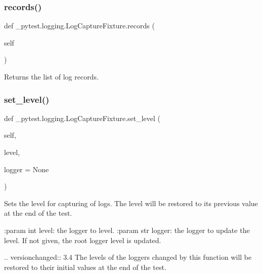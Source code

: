 \subsubsection{\texorpdfstring{records()}{records()}}
{\footnotesize\ttfamily def \+\_\+pytest.\+logging.\+Log\+Capture\+Fixture.\+records (\begin{DoxyParamCaption}\item[{}]{self }\end{DoxyParamCaption})}

\begin{DoxyVerb}Returns the list of log records.\end{DoxyVerb}
 \mbox{\label{class__pytest_1_1logging_1_1_log_capture_fixture_aca085734a490329f84018fa43c426e7d}} 
\subsubsection{\texorpdfstring{set\+\_\+level()}{set\_level()}}
{\footnotesize\ttfamily def \+\_\+pytest.\+logging.\+Log\+Capture\+Fixture.\+set\+\_\+level (\begin{DoxyParamCaption}\item[{}]{self,  }\item[{}]{level,  }\item[{}]{logger = {\ttfamily None} }\end{DoxyParamCaption})}

\begin{DoxyVerb}Sets the level for capturing of logs. The level will be restored to its previous value at the end of
the test.

:param int level: the logger to level.
:param str logger: the logger to update the level. If not given, the root logger level is updated.

.. versionchanged:: 3.4
    The levels of the loggers changed by this function will be restored to their initial values at the
    end of the test.
\end{DoxyVerb}
 \mbox{\label{class__pytest_1_1logging_1_1_log_capture_fixture_a565ec737a85feaff999463f62a4863f3}} 
